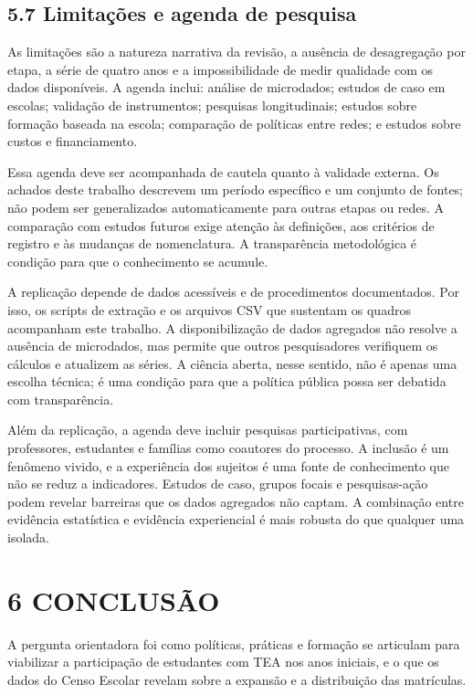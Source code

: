 \subsection{5.7 Limitações e agenda de
pesquisa}\label{limitauxe7uxf5es-e-agenda-de-pesquisa}

As limitações são a natureza narrativa da revisão, a ausência de
desagregação por etapa, a série de quatro anos e a impossibilidade de
medir qualidade com os dados disponíveis. A agenda inclui: análise de
microdados; estudos de caso em escolas; validação de instrumentos;
pesquisas longitudinais; estudos sobre formação baseada na escola;
comparação de políticas entre redes; e estudos sobre custos e
financiamento.

Essa agenda deve ser acompanhada de cautela quanto à validade externa.
Os achados deste trabalho descrevem um período específico e um conjunto
de fontes; não podem ser generalizados automaticamente para outras
etapas ou redes. A comparação com estudos futuros exige atenção às
definições, aos critérios de registro e às mudanças de nomenclatura. A
transparência metodológica é condição para que o conhecimento se
acumule.

A replicação depende de dados acessíveis e de procedimentos
documentados. Por isso, os scripts de extração e os arquivos CSV que
sustentam os quadros acompanham este trabalho. A disponibilização de
dados agregados não resolve a ausência de microdados, mas permite que
outros pesquisadores verifiquem os cálculos e atualizem as séries. A
ciência aberta, nesse sentido, não é apenas uma escolha técnica; é uma
condição para que a política pública possa ser debatida com
transparência.

Além da replicação, a agenda deve incluir pesquisas participativas, com
professores, estudantes e famílias como coautores do processo. A
inclusão é um fenômeno vivido, e a experiência dos sujeitos é uma fonte
de conhecimento que não se reduz a indicadores. Estudos de caso, grupos
focais e pesquisas-ação podem revelar barreiras que os dados agregados
não captam. A combinação entre evidência estatística e evidência
experiencial é mais robusta do que qualquer uma isolada.

\section{6 CONCLUSÃO}\label{conclusuxe3o}

A pergunta orientadora foi como políticas, práticas e formação se
articulam para viabilizar a participação de estudantes com TEA nos anos
iniciais, e o que os dados do Censo Escolar revelam sobre a expansão e a
distribuição das matrículas.

